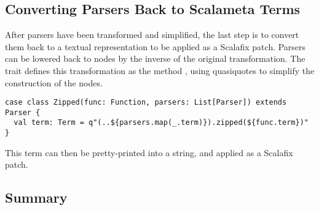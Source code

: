 \documentclass[../../main.tex]{subfiles}
\begin{document}
\subsection{Converting Parsers Back to Scalameta Terms}
After parsers have been transformed and simplified, the last step is to convert them back to a textual representation to be applied as a Scalafix patch.
Parsers can be lowered back to  nodes by the inverse of the original  transformation.
The  trait defines this transformation as the method , using quasiquotes to simplify the construction of the  nodes.
\begin{verbatim}
case class Zipped(func: Function, parsers: List[Parser]) extends Parser {
  val term: Term = q"(..${parsers.map(_.term)}).zipped(${func.term})"
}
\end{verbatim}
%
This term can then be pretty-printed into a string, and applied as a Scalafix patch.

\subsection*{Summary}
\end{document}
